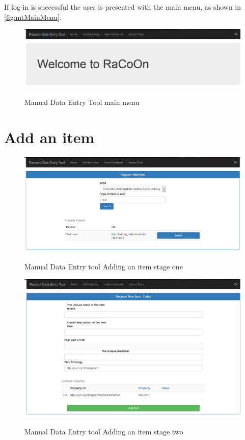 If log-in is successful the user is presented with the main menu, as shown in \autoref{fig:mtMainMenu}. 
 \begin{figure}[!h]
\myfloatalign
{\includegraphics[max height=0.5\textheight,max width=\linewidth]{gfx/manToolInUse}} 
\caption[Manual Data Entry Tool]{Manual Data Entry Tool main menu}
\label{fig:mtMainMenu}
\end{figure}

\section{Add an item}

 \begin{figure}[!h]
\myfloatalign
{\includegraphics[max height=0.5\textheight,max width=\linewidth]{gfx/manToolAddingItem}} 
\caption[Manual Data Entry Tool Add item stage 1]{Manual Data Entry tool Adding an item stage one}
\label{fig:mtAddingItem}
\end{figure}

 \begin{figure}[!h]
\myfloatalign
{\includegraphics[max height=0.5\textheight,max width=\linewidth]{gfx/addItemDetail}} 
\caption[Manual Data Entry Tool Add item stage 2]{Manual Data Entry tool Adding an item stage two}
\label{fig:mtAddingItemDetail}
\end{figure}

